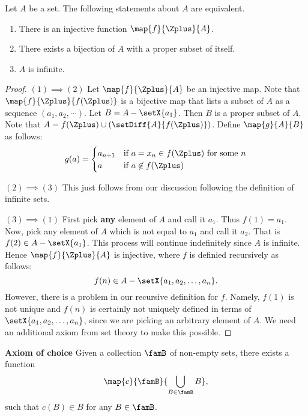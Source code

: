 \begin{Theorem}
    Let $A$ be a set. The following statements about $A$ are equivalent.
    \begin{enumerate}
	\item
	    There is an injective function $\map{f}{\Zplus}{A}$.
	\item
	    There exists a bijection of $A$ with a proper subset of itself.
	\item
	    $A$ is infinite.
    \end{enumerate}
\end{Theorem}
\begin{proof}
    $(1)\implies(2)$
    Let $\map{f}{\Zplus}{A}$ be an injective map. Note that $\map{f}{\Zplus}{f(\Zplus)}$ is a bijective map
    that lists a subset of $A$ as a sequence $(a_1,a_2,\cdots)$. Let $B = A - \setX{a_1}$. Then $B$ is a
    proper subset of $A$. Note that $A = f(\Zplus)\cup (\setDiff{A}{f(\Zplus)})$. 
    Define $\map{g}{A}{B}$ as follows:
    \begin{equation*}
	g(a) = 
	\begin{cases}
	    a_{n+1}&\text{if $a = x_n \in f(\Zplus)$ for some $n$}\\
	    a &\text{if $a \not\in f(\Zplus)$}
	\end{cases}
    \end{equation*}

    $(2)\implies(3)$ This just follows from our discussion following the definition of infinite sets.

    $(3)\implies(1)$
    First pick \textbf{any} element of $A$ and call it $a_1$. Thus $f(1) = a_1$. Now, pick any element of $A$
    which is not equal to $a_1$ and call it $a_2$. That is $f(2) \in A - \setX{a_1}$. This process will
    continue indefinitely since $A$ is infinite. Hence $\map{f}{\Zplus}{A}$ is injective, where $f$ is
    definied recursively as follows:
    \[f(n) \in A - \setX{a_1,a_2,\ldots,a_n}.\]
    However, there is a problem in our recursive definition for $f$. Namely, $f(1)$ is not unique and $f(n)$
    is certainly not uniquely defined in terms of $\setX{a_1,a_2,\ldots,a_n}$, since we are picking an
    arbitrary element of $A$. We need an additional axiom from set theory to make this possible.
\end{proof}


\textbf{Axiom of choice} Given a collection $\famB$ of non-empty sets, there exists a function 
\[\map{c}{\famB}{\bigcup\limits_{B\in\famB}B},\]
such that $c(B)\in B$ for any $B \in \famB$.

